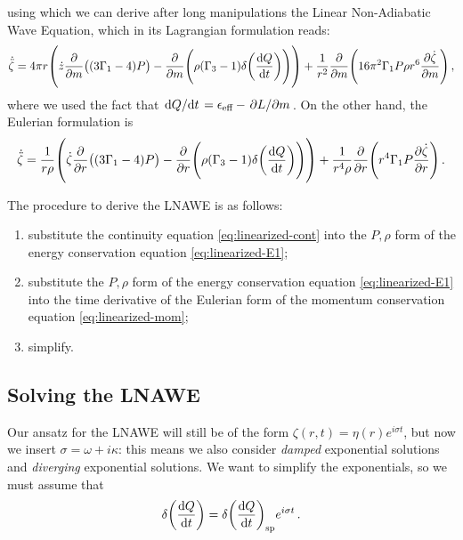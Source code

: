\documentclass[main.tex]{subfiles}
\begin{document}
%
using which we can derive after long manipulations the Linear Non-Adiabatic Wave Equation, which in its Lagrangian formulation reads: 
%
\begin{align}
\dot{\ddot{\zeta}}
=
4 \pi r \qty(\dot{z} \pdv{}{m} \qty((3 \Gamma_1 - 4)P) 
-  \pdv{}{m} \qty(\rho (\Gamma_3 - 1) \delta \qty(\dv{Q}{t})))
+ \frac{1}{r^2} \pdv{}{m} \qty(16 \pi^2 \Gamma_1 P \rho r^{6} \pdv{\dot{\zeta}}{m})
\,,
\end{align}
%
where we used the fact that \(\dv*{Q}{t} = \epsilon _{\text{eff}} - \pdv*{L}{m}\). On the other hand, the Eulerian formulation is 
%
\begin{align}
\dot{\ddot{\zeta}} = \frac{1}{r \rho } \qty(\dot{\zeta}\pdv{}{r} \qty((3\Gamma_1 -4) P ) - \pdv{}{r} \qty(\rho (\Gamma_3 -1) \delta \qty(\dv{Q}{t})))
+ \frac{1}{r^4 \rho}\pdv{}{r}\qty(r^{4} \Gamma_1 P \pdv{\dot{\zeta}}{r}) 
\,.
\end{align}

\begin{bluebox}
The procedure to derive the LNAWE is as follows: 
\begin{enumerate}
  \item substitute the continuity equation \eqref{eq:linearized-cont} into the \(P, \rho \) form of the energy conservation equation \eqref{eq:linearized-E1}; 
  \item substitute the \(P, \rho \) form of the energy conservation equation \eqref{eq:linearized-E1} into the time derivative of the Eulerian form of the momentum conservation equation \eqref{eq:linearized-mom};
  \item simplify.
\end{enumerate}
\end{bluebox}

\subsection{Solving the LNAWE}

Our ansatz for the LNAWE will still be of the form \(\zeta (r, t) = \eta (r) e^{i \sigma t}\), but now we insert \(\sigma = \omega + i \kappa \): this means we also consider \emph{damped} exponential solutions and \emph{diverging} exponential solutions. 
We want to simplify the exponentials, so we must assume that 
%
\begin{align}
\delta \qty(\dv{Q}{t}) = \delta \qty(\dv{Q}{t}) _{\text{sp}} e^{i \sigma t}
\,.
\end{align}

\end{document}

